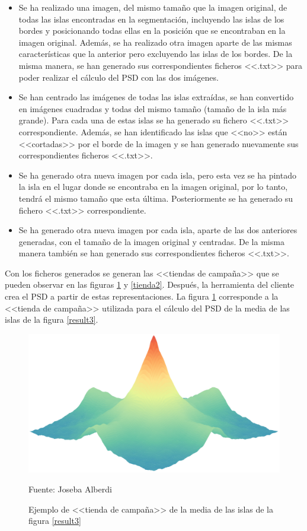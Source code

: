 \begin{itemize}
	\item Se ha realizado una imagen, del mismo tama\~{n}o que la imagen original, de todas las islas encontradas en la segmentaci\'{o}n, incluyendo las islas de los bordes y posicionando todas ellas en la posici\'{o}n que se encontraban en la imagen original. Adem\'{a}s, se ha realizado otra imagen aparte de las mismas caracter\'{i}sticas que la anterior pero excluyendo las islas de los bordes. De la misma manera, se han generado sus correspondientes ficheros <<.txt>> para poder realizar el c\'{a}lculo del PSD con las dos im\'{a}genes.
	\item Se han centrado las im\'{a}genes de todas las islas extra\'{i}das, se han convertido en im\'{a}genes cuadradas y todas del mismo tama\~{n}o (tama\~{n}o de la isla m\'{a}s grande). Para cada una de estas islas se ha generado su fichero <<.txt>> correspondiente. Adem\'{a}s, se han identificado las islas que <<no>> est\'{a}n <<cortadas>> por el borde de la imagen y se han generado nuevamente sus correspondientes ficheros <<.txt>>.
	\item Se ha generado otra nueva imagen por cada isla, pero esta vez se ha pintado la isla en el lugar donde se encontraba en la imagen original, por lo tanto, tendr\'{a} el mismo tama\~{n}o que esta \'{u}ltima. Posteriormente se ha generado su fichero <<.txt>> correspondiente.
	\item Se ha generado otra nueva imagen por cada isla, aparte de las dos anteriores generadas, con el tama\~{n}o de la imagen original y centradas. De la misma manera tambi\'{e}n se han generado sus correspondientes ficheros <<.txt>>.  
\end{itemize}

Con los ficheros generados se generan las <<tiendas de campa\~{n}a>> que se pueden observar en las figuras \ref{tienda} y \ref{tienda2}. Despu\'{e}s, la herramienta del cliente crea el PSD a partir de estas representaciones. La figura \ref{tienda} corresponde a la <<tienda de campa\~{n}a>> utilizada para el c\'{a}lculo del PSD de la media de las islas de la figura \ref{result3}. 

\begin{figure}[H]
	\captionsetup{justification=centering}
	\centering
	\includegraphics[width=.6\textwidth]{./imagenes/psd}
	\caption{Ejemplo de <<tienda de campa\~{n}a>> de la media de las islas de la figura \ref{result3}}	
	\label{tienda}
	Fuente: Joseba Alberdi
\end{figure}

